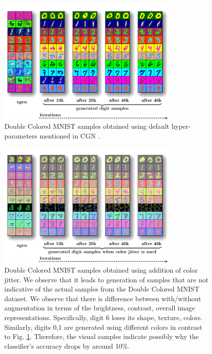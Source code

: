 \begin{appendices}
\begin{figure}[ht!]
\centering
    \includegraphics[width=0.8\textwidth,height=0.5\textwidth]{../openreview/images/x_gen_original.pdf}
    \caption{Double Colored MNIST samples obtained using default hyper-parameters mentioned in CGN \cite{sauer2021counterfactual}.
    }
    \label{fig:original_grid}
\end{figure}

\begin{figure}[ht!]
\centering 
    \includegraphics[width=0.8\textwidth,height=0.5\textwidth]{images/x_gen_data_augment.pdf}
    \caption{Double Colored MNIST samples obtained using addition of color jitter. We observe that it leads to generation of samples that are not indicative of the actual samples from the Double Colored MNIST dataset.  We observe that there is difference between with/without augmentation in terms of the brightness, contrast, overall image representations. Specifically, digit 6 loses its shape, texture, colors. Similarly, digits 0,1 are generated using different colors in contrast to Fig. \ref{fig:original_grid}. Therefore, the visual samples indicate possibly why the classifier's accuracy drops by around 10\%. 
    }
    \label{fig:data_augment_grid}
\end{figure}

\end{appendices}


